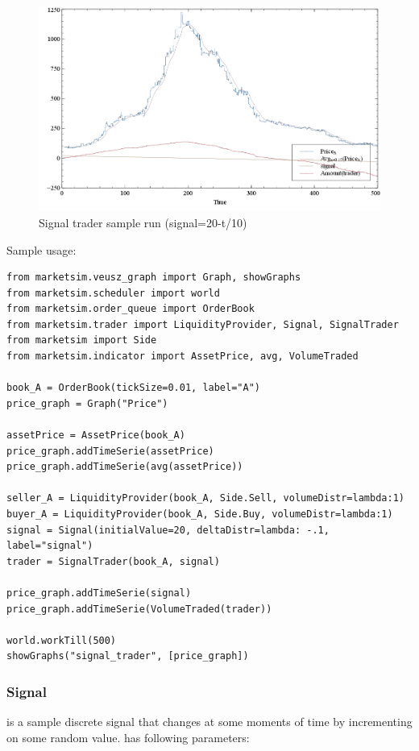 \documentclass[a4paper,11pt]{article}
\newcommand{\tmtexttt}[1]{{\ttfamily{#1}}}
\begin{document}
\begin{figure}[htbp]
\centering
\includegraphics[width=1\linewidth]{Figures/Signal.PNG}
\caption{Signal trader sample run (signal=20-t/10)}
\label{fig:Signalr}
\end{figure}

Sample usage:

\begin{verbatim}
from marketsim.veusz_graph import Graph, showGraphs
from marketsim.scheduler import world
from marketsim.order_queue import OrderBook
from marketsim.trader import LiquidityProvider, Signal, SignalTrader
from marketsim import Side
from marketsim.indicator import AssetPrice, avg, VolumeTraded

book_A = OrderBook(tickSize=0.01, label="A")
price_graph = Graph("Price")
 
assetPrice = AssetPrice(book_A)
price_graph.addTimeSerie(assetPrice)
price_graph.addTimeSerie(avg(assetPrice))

seller_A = LiquidityProvider(book_A, Side.Sell, volumeDistr=lambda:1)
buyer_A = LiquidityProvider(book_A, Side.Buy, volumeDistr=lambda:1)
signal = Signal(initialValue=20, deltaDistr=lambda: -.1, label="signal")
trader = SignalTrader(book_A, signal)

price_graph.addTimeSerie(signal)
price_graph.addTimeSerie(VolumeTraded(trader))

world.workTill(500)
showGraphs("signal_trader", [price_graph])
\end{verbatim}

\subsubsection{Signal}

\tmtexttt{Signal} is a sample discrete signal that changes at some moments of time by incrementing on some random value. \tmtexttt{Signal} has following parameters:
\end{document}
